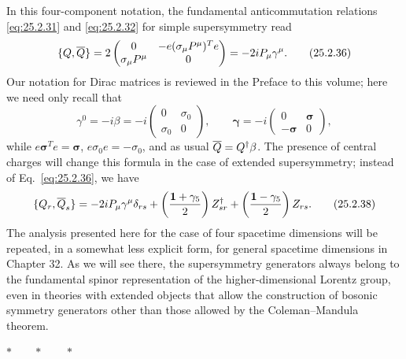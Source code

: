 In this four-component notation, the fundamental anticommutation relations
\eqref{eq:25.2.31} and \eqref{eq:25.2.32} for simple supersymmetry read
\begin{equation}
\{Q,\overline{Q}\}
=2
\begin{pmatrix}
0&-e(\sigma_\mu P^\mu)^T e\\
\sigma_\mu P^\mu&0
\end{pmatrix}
=-2iP_\mu\gamma^\mu.
\tag{25.2.36}\label{eq:25.2.36}
\end{equation}
Our notation for Dirac matrices is reviewed in the Preface to this volume;
here we need only recall that
\begin{equation}
\gamma^0=-i\beta
=-i
\begin{pmatrix}
0&\sigma_0\\
\sigma_0&0
\end{pmatrix},
\qquad
\boldsymbol{\gamma}
=-i
\begin{pmatrix}
0&\boldsymbol{\sigma}\\
-\boldsymbol{\sigma}&0
\end{pmatrix},
\tag{25.2.37}\label{eq:25.2.37}
\end{equation}
while \(e\boldsymbol{\sigma}^T e=\boldsymbol{\sigma}\),
\(e\sigma_0e=-\sigma_0\), and as usual
\(\overline{Q}=Q^\dagger\beta\). The presence of central
charges will change this formula in the case of extended supersymmetry;
instead of Eq.~\eqref{eq:25.2.36}, we have
\begin{equation}
\{Q_r,\overline{Q}_s\}
=-2iP_\mu\gamma^\mu\delta_{rs}
+\left(\frac{\mathbf{1}+\gamma_5}{2}\right)Z_{sr}^\dagger
+\left(\frac{\mathbf{1}-\gamma_5}{2}\right)Z_{rs}.
\tag{25.2.38}\label{eq:25.2.38}
\end{equation}
The analysis presented here for the case of four spacetime dimensions will
be repeated, in a somewhat less explicit form, for general spacetime
dimensions in Chapter 32. As we will see there, the supersymmetry generators
always belong to the fundamental spinor representation of the
higher-dimensional Lorentz group, even in theories with extended objects
that allow the construction of bosonic symmetry generators other than those
allowed by the Coleman--Mandula theorem.

\begin{center}
\(\ast\qquad\ast\qquad\ast\)
\end{center}

